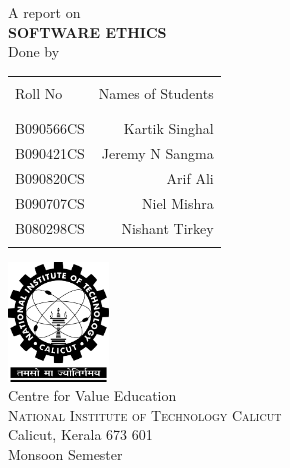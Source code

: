 \begin{titlepage}

\begin{center}

\textup{\large A report on}\\[1.0cm]

\uppercase{\Large \textbf {Software Ethics}}\\[3.0cm]

\normalsize Done by \\
\begin{table}[h]
\centering
\begin{tabular}{lr}\hline \\
Roll No & Names of Students \\ \\ \hline
\\
B090566CS & Kartik Singhal \\ 
B090421CS & Jeremy N Sangma \\ 
B090820CS & Arif Ali \\ 
B090707CS & Niel Mishra \\ 
B080298CS & Nishant Tirkey \\ \\ \hline 
\end{tabular}
\end{table}

\vfill

\includegraphics[width=0.20\textwidth]{./nitc-logo}\\[1cm]
\LARGE{Centre for Value Education}\\
\normalsize
\textsc{National Institute of Technology Calicut}\\
Calicut, Kerala 673 601 \\
\vspace{0.5cm}
Monsoon Semester

\end{center}

\end{titlepage}
